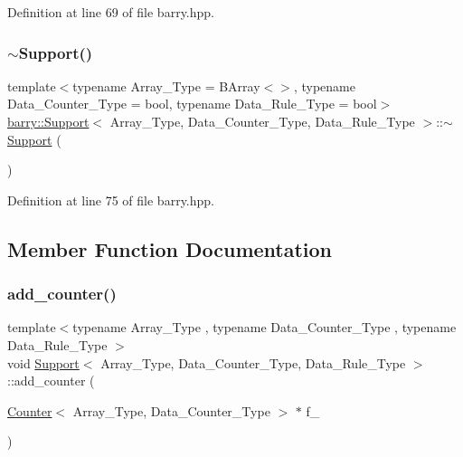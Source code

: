 Definition at line 69 of file barry.\+hpp.

\mbox{\label{classbarry_1_1_support_a4ea99cc1691b04b76a333e851aab4b64}} 
\subsubsection{\texorpdfstring{$\sim$\+Support()}{~Support()}}
{\footnotesize\ttfamily template$<$typename Array\+\_\+\+Type  = B\+Array$<$$>$, typename Data\+\_\+\+Counter\+\_\+\+Type  = bool, typename Data\+\_\+\+Rule\+\_\+\+Type  = bool$>$ \\
\hyperlink{classbarry_1_1_support}{barry\+::\+Support}$<$ Array\+\_\+\+Type, Data\+\_\+\+Counter\+\_\+\+Type, Data\+\_\+\+Rule\+\_\+\+Type $>$\+::$\sim$\hyperlink{classbarry_1_1_support}{Support} (\begin{DoxyParamCaption}{ }\end{DoxyParamCaption})\hspace{0.3cm}{\ttfamily [inline]}}



Definition at line 75 of file barry.\+hpp.



\subsection{Member Function Documentation}
\mbox{\label{classbarry_1_1_support_a364df2c6295341f2801ebe0419d1d97c}} 
\subsubsection{\texorpdfstring{add\+\_\+counter()}{add\_counter()}\hspace{0.1cm}{\footnotesize\ttfamily [1/2]}}
{\footnotesize\ttfamily template$<$typename Array\+\_\+\+Type , typename Data\+\_\+\+Counter\+\_\+\+Type , typename Data\+\_\+\+Rule\+\_\+\+Type $>$ \\
void \hyperlink{classbarry_1_1_support}{Support}$<$ Array\+\_\+\+Type, Data\+\_\+\+Counter\+\_\+\+Type, Data\+\_\+\+Rule\+\_\+\+Type $>$\+::add\+\_\+counter (\begin{DoxyParamCaption}\item[{\hyperlink{classbarry_1_1_counter}{Counter}$<$ Array\+\_\+\+Type, Data\+\_\+\+Counter\+\_\+\+Type $>$ $\ast$}]{f\+\_\+ }\end{DoxyParamCaption})\hspace{0.3cm}{\ttfamily [inline]}}



